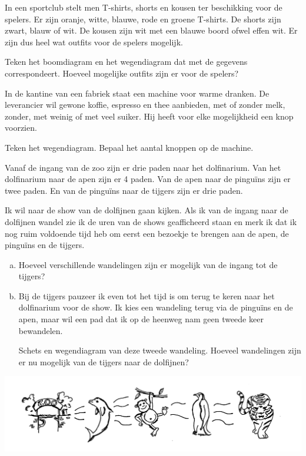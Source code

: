 \documentclass[12pt,twoside]{article}
\begin{document}
\begin{oefening}
In een sportclub stelt men T-shirts, shorts en kousen ter beschikking voor de spelers. Er zijn oranje, witte, blauwe, rode en groene T-shirts. De shorts zijn zwart, blauw of wit. De kousen zijn wit met een blauwe boord ofwel effen wit. Er zijn dus heel wat outfits voor de spelers mogelijk.

Teken het boomdiagram en het wegendiagram dat met de gegevens correspondeert. Hoeveel mogelijke outfits zijn er voor de spelers?
\end{oefening}

\begin{oefening}
In de kantine van een fabriek staat een machine voor warme dranken. De leverancier wil gewone koffie, espresso en thee aanbieden, met of zonder melk, zonder, met weinig of met veel suiker. Hij heeft voor elke mogelijkheid een knop voorzien.

Teken het wegendiagram. Bepaal het aantal knoppen op de machine.
\end{oefening}

\begin{oefening}
Vanaf de ingang van de zoo zijn er drie paden naar het dolfinarium. Van het dolfinarium naar de apen zijn er 4 paden. Van de apen naar de pinguïns zijn er twee paden. En van de pinguïns naar de tijgers zijn er drie paden.

Ik wil naar de show van de dolfijnen gaan kijken. Als ik van de ingang naar de dolfijnen wandel zie ik de uren van de shows geafficheerd staan en merk ik dat ik nog ruim voldoende tijd heb om eerst een bezoekje te brengen aan de apen, de pinguïns en de tijgers.

\begin{enumerate}[(a)]
  \item Hoeveel verschillende wandelingen zijn er mogelijk van de ingang tot de tijgers?
  \item Bij de tijgers pauzeer ik even tot het tijd is om terug te keren naar het dolfinarium voor de show. Ik kies een wandeling terug via de pinguïns en de apen, maar wil een pad dat ik op de heenweg nam geen tweede keer bewandelen.
  
  Schets en wegendiagram van deze tweede wandeling. Hoeveel wandelingen zijn er nu mogelijk van de tijgers naar de dolfijnen?
\end{enumerate}

\begin{center}
  \includegraphics[width=\textwidth]{zoodieren}
\end{center}
\end{oefening}
\end{document}
